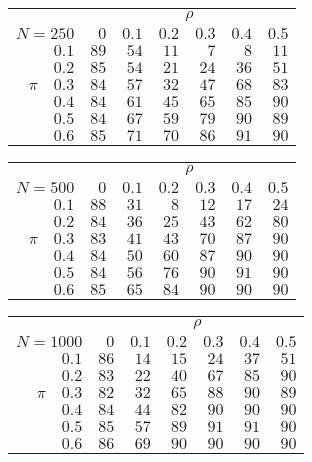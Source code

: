 \begin{tabular}{r|rrrrrr}
\hline\hline
 &\multicolumn{6}{c}{$\rho$} \\ 
 $N = 250$ & $0$ & $0.1$ & $0.2$ & $0.3$ & $0.4$ & $0.5$ \\ 
 \hline$0.1$ & $89$ & $54$ & $11$ & $7$ & $8$ & $11$\\ 
$0.2$ & $85$ & $54$ & $21$ & $24$ & $36$ & $51$\\ 
$\pi\quad$$0.3$ & $84$ & $57$ & $32$ & $47$ & $68$ & $83$\\ 
$0.4$ & $84$ & $61$ & $45$ & $65$ & $85$ & $90$\\ 
$0.5$ & $84$ & $67$ & $59$ & $79$ & $90$ & $89$\\ 
$0.6$ & $85$ & $71$ & $70$ & $86$ & $91$ & $90$\\ 
 \hline 
 \end{tabular}
 
 \vspace{2em} 
 
\begin{tabular}{r|rrrrrr}
\hline\hline
 &\multicolumn{6}{c}{$\rho$} \\ 
 $N = 500$ & $0$ & $0.1$ & $0.2$ & $0.3$ & $0.4$ & $0.5$ \\ 
 \hline$0.1$ & $88$ & $31$ & $8$ & $12$ & $17$ & $24$\\ 
$0.2$ & $84$ & $36$ & $25$ & $43$ & $62$ & $80$\\ 
$\pi\quad$$0.3$ & $83$ & $41$ & $43$ & $70$ & $87$ & $90$\\ 
$0.4$ & $84$ & $50$ & $60$ & $87$ & $90$ & $90$\\ 
$0.5$ & $84$ & $56$ & $76$ & $90$ & $91$ & $90$\\ 
$0.6$ & $85$ & $65$ & $84$ & $90$ & $90$ & $90$\\ 
 \hline 
 \end{tabular}
 
 \vspace{2em} 
 
\begin{tabular}{r|rrrrrr}
\hline\hline
 &\multicolumn{6}{c}{$\rho$} \\ 
 $N = 1000$ & $0$ & $0.1$ & $0.2$ & $0.3$ & $0.4$ & $0.5$ \\ 
 \hline$0.1$ & $86$ & $14$ & $15$ & $24$ & $37$ & $51$\\ 
$0.2$ & $83$ & $22$ & $40$ & $67$ & $85$ & $90$\\ 
$\pi\quad$$0.3$ & $82$ & $32$ & $65$ & $88$ & $90$ & $89$\\ 
$0.4$ & $84$ & $44$ & $82$ & $90$ & $90$ & $90$\\ 
$0.5$ & $85$ & $57$ & $89$ & $91$ & $91$ & $90$\\ 
$0.6$ & $86$ & $69$ & $90$ & $90$ & $90$ & $90$\\ 
 \hline 
 \end{tabular}